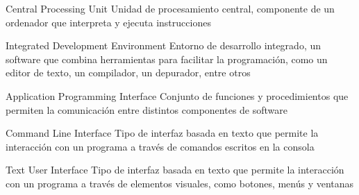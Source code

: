 

{Central Processing Unit}
{Unidad de procesamiento central, componente de un ordenador que interpreta y ejecuta instrucciones}


{Integrated Development Environment}
{Entorno de desarrollo integrado, un software que combina herramientas para facilitar la programación, como un editor de texto, un compilador, un depurador, entre otros}

{Application Programming Interface}
{Conjunto de funciones y procedimientos que permiten la comunicación entre distintos componentes de software}


{Command Line Interface}
{Tipo de interfaz basada en texto que permite la interacción con un programa a través de comandos escritos en la consola}

{Text User Interface}
{Tipo de interfaz basada en texto que permite la interacción con un programa a través de elementos visuales, como botones, menús y ventanas}

